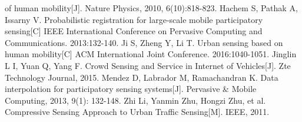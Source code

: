 \documentclass[UTF8]{ctexart}
\begin{document}
\begin{thebibliography}{99}
  of human mobility[J]. Nature Physics, 2010, 6(10):818-823.
   Hachem S, Pathak A, Issarny V. Probabilistic registration for
  large-scale mobile participatory sensing[C] IEEE International Conference
  on Pervasive Computing and Communications. 2013:132-140.
   Ji S, Zheng Y, Li T. Urban sensing based on human mobility[C]
  ACM International Joint Conference. 2016:1040-1051.
   Jinglin L I, Yuan Q, Yang F. Crowd Sensing and Service in Internet
  of Vehicles[J]. Zte Technology Journal, 2015.
   Mendez D, Labrador M, Ramachandran K. Data interpolation for
  participatory sensing systems[J]. Pervasive \& Mobile Computing, 2013, 9(1):
  132-148.
   Zhi Li, Yanmin Zhu, Hongzi Zhu, et al. Compressive Sensing
  Approach to Urban Traffic Sensing[M]. IEEE, 2011.
\end{thebibliography}
\end{document}
